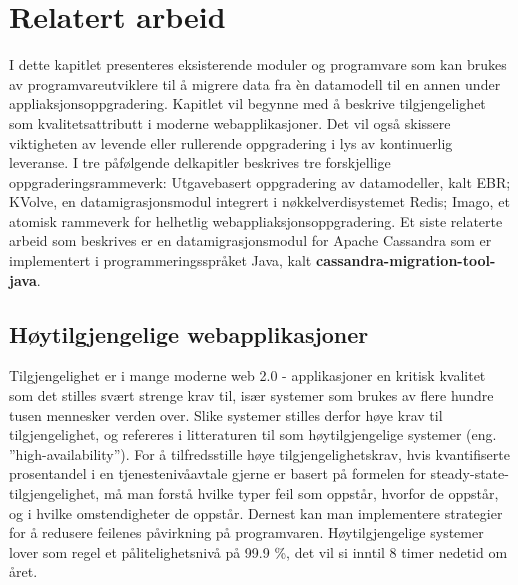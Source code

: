 
\chapter{Relatert arbeid}

I dette kapitlet presenteres eksisterende moduler og programvare som kan brukes av programvareutviklere til å migrere data fra èn datamodell til en annen under appliaksjonsoppgradering. Kapitlet vil begynne med å beskrive tilgjengelighet som kvalitetsattributt i moderne webapplikasjoner. Det vil også skissere viktigheten av  levende eller rullerende oppgradering i lys av kontinuerlig leveranse. I tre påfølgende delkapitler beskrives tre forskjellige oppgraderingsrammeverk: Utgavebasert oppgradering av datamodeller, kalt EBR; KVolve, en datamigrasjonsmodul integrert i nøkkelverdisystemet Redis; Imago, et atomisk rammeverk for helhetlig webappliaksjonsoppgradering. Et siste relaterte arbeid som beskrives er en datamigrasjonsmodul for Apache Cassandra som er implementert i programmeringsspråket Java, kalt \textbf{cassandra-migration-tool-java}.

\section{Høytilgjengelige webapplikasjoner}

Tilgjengelighet er i mange moderne web 2.0 - applikasjoner en kritisk kvalitet som det stilles svært strenge krav til, især systemer som brukes av flere hundre tusen mennesker verden over. Slike systemer stilles derfor høye krav til tilgjengelighet, og refereres i litteraturen til som høytilgjengelige systemer (eng. ''high-availability''). For å tilfredsstille høye tilgjengelighetskrav, hvis kvantifiserte prosentandel i en tjenestenivåavtale gjerne er basert på formelen for steady-state-tilgjengelighet, må man forstå hvilke typer feil som oppstår, hvorfor de oppstår, og i hvilke omstendigheter de oppstår. Dernest kan man implementere strategier for å redusere feilenes påvirkning på programvaren. Høytilgjengelige systemer lover som regel et pålitelighetsnivå på 99.9 \%, det vil si inntil 8 timer nedetid om året.




\cleardoublepage